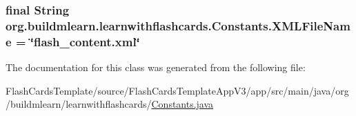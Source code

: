 \subsubsection[{\texorpdfstring{X\+M\+L\+File\+Name}{XMLFileName}}]{\setlength{\rightskip}{0pt plus 5cm}final String org.\+buildmlearn.\+learnwithflashcards.\+Constants.\+X\+M\+L\+File\+Name = \char`\"{}flash\+\_\+content.\+xml\char`\"{}\hspace{0.3cm}{\ttfamily [static]}}\hypertarget{classorg_1_1buildmlearn_1_1learnwithflashcards_1_1Constants_a77c0991f80b2756b02f410eb1d5c862f}{}\label{classorg_1_1buildmlearn_1_1learnwithflashcards_1_1Constants_a77c0991f80b2756b02f410eb1d5c862f}


The documentation for this class was generated from the following file\+:\begin{DoxyCompactItemize}
\item 
Flash\+Cards\+Template/source/\+Flash\+Cards\+Template\+App\+V3/app/src/main/java/org/buildmlearn/learnwithflashcards/\hyperlink{FlashCardsTemplate_2source_2FlashCardsTemplateAppV3_2app_2src_2main_2java_2org_2buildmlearn_2lea04b6faf9955054f7c7c030b6f90eb45a}{Constants.\+java}\end{DoxyCompactItemize}
